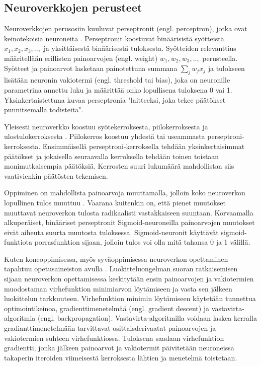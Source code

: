 \documentclass[utf8]{gradu3}
\begin{document}
\subsection{Neuroverkkojen perusteet}

Neuroverkkojen perusosiin kuuluvat perseptronit (engl. perceptron), jotka ovat keinotekoisia neuroneita \parencite{nielsen2015neural}. Perseptronit koostuvat binäärisistä syötteistä \(x_{1}, x_{2}, x_{3},..,\) ja yksittäisestä binäärisestä tuloksesta. Syötteiden relevanttius määritellään erillisten painoarvojen (engl. weight) \(w_{1}, w_{2}, w_{3},..,\) perusteella. Syötteet ja painoarvot lasketaan painotettuna summana $\sum_{j}w_{j}x_{j}$ ja tulokseen lisätään neuronin vakiotermi (engl. threshold tai bias), joka on neuronille parametrina annettu luku ja määrittää onko lopullisena tuloksena 0 vai 1. Yksinkertaistettuna \textcite{nielsen2015neural} kuvaa perseptronia "laitteeksi, joka tekee päätökset punnitsemalla todisteita".

Yleisesti neuroverkko koostuu syötekerroksesta, piilokerroksesta ja ulostulokerroksesta \parencite{nielsen2015neural}. Piilokerros koostuu yhdestä tai useammasta perseptroni-kerroksesta. Ensimmäisellä perseptroni-kerroksella tehdään yksinkertaisimmat päätökset ja jokaisella seuraavalla kerroksella tehdään toinen toistaan monimutkaisempia päätöksiä. Kerrosten suuri lukumäärä mahdollistaa siis vaativienkin päätösten tekemisen.

Oppiminen on mahdollista painoarvoja muuttamalla, jolloin koko neuroverkon lopullinen tulos muuttuu \parencite{nielsen2015neural}. Vaarana kuitenkin on, että pienet muutokset muuttavat neuroverkon tulosta radikaalisti vastakkaiseen suuntaan. Korvaamalla alkuperäiset, binääriset perseptronit Sigmoid-neuroneilla painoarvojen muutokset eivät aiheuta suurta muutosta tuloksessa. Sigmoid-neuronit käyttävät sigmoid-funktiota porrasfunktion sijaan, jolloin tulos voi olla mitä tahansa 0 ja 1 välillä.

Kuten koneoppimisessa, myös syväoppimisessa neuroverkon opettaminen tapahtuu opetusaineiston avulla \parencite{nielsen2015neural}. Luokitteluongelman suoran ratkaisemisen sijaan neuroverkon opettamisessa keskitytään ensin painoarvojen ja vakiotermien muodostaman virhefunktion minimiarvon löytämiseen ja vasta sen jälkeen luokittelun tarkkuuteen. Virhefunktion minimin löytämiseen käytetään tunnettua optimointikeinoa, gradienttimenetelmää (engl. gradient descent) ja vastavirta-algoritmia (engl. backpropagation). Vastavirta-algoritmilla voidaan laskea kerralla gradianttimenetelmään tarvittavat osittaisderivaatat painoarvojen ja vakiotermien suhteen virhefunktiossa. Tuloksena saadaan virhefunktion gradientti, jonka jälkeen painoarvot ja vakiotermit päivitetään neuroneissa takaperin iteroiden viimeisestä kerroksesta lähtien ja menetelmä toistetaan.
\end{document}
